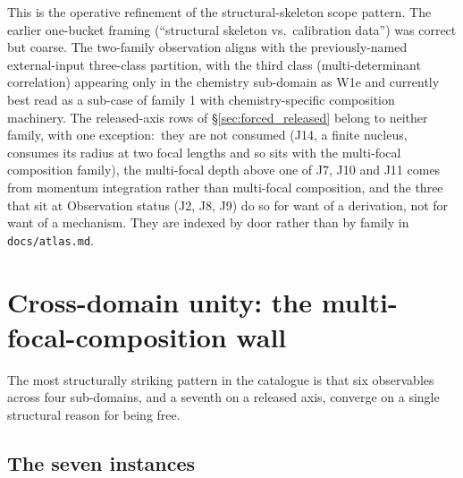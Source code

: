 \documentclass[11pt,a4paper]{article}
\theoremstyle{plain}
\theoremstyle{definition}
\begin{document}
This is the operative refinement of the structural-skeleton scope pattern. The earlier one-bucket framing (``structural skeleton vs.\ calibration data'') was correct but coarse. The two-family observation aligns with the previously-named external-input three-class partition, with the third class (multi-determinant correlation) appearing only in the chemistry sub-domain as W1e and currently best read as a sub-case of family 1 with chemistry-specific composition machinery. The released-axis rows of \S\ref{sec:forced_released} belong to neither family, with one exception:\ they are not consumed (J14, a finite nucleus, consumes its radius at two focal lengths and so sits with the multi-focal composition family), the multi-focal depth above one of J7, J10 and J11 comes from momentum integration rather than multi-focal composition, and the three that sit at Observation status (J2, J8, J9) do so for want of a derivation, not for want of a mechanism. They are indexed by door rather than by family in \texttt{docs/atlas.md}.

\section{Cross-domain unity: the multi-focal-composition wall}
\label{sec:unity}

The most structurally striking pattern in the catalogue is that six observables across four sub-domains, and a seventh on a released axis, converge on a single structural reason for being free.

\subsection{The seven instances}
\label{sec:unity_six}
\end{document}
